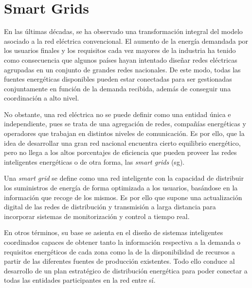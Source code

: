\section{Smart Grids}
\label{sec:smartgrids}


En las últimas décadas, se ha observado una transformación integral del modelo asociado a la red eléctrica convencional. El aumento de la energía demandada por los usuarios finales y los requisitos cada vez mayores de la industria ha tenido como consecuencia que algunos países hayan intentado diseñar redes eléctricas agrupadas en un conjunto de grandes redes nacionales. De este modo, todas las fuentes energéticas disponibles pueden estar conectadas para ser gestionadas conjuntamente en función de la demanda recibida, además de conseguir una coordinación a alto nivel. \cite{smartgrid_overview}

\vspace{3mm}

No obstante, una red eléctrica no se puede definir como una entidad única e independiente, pues se trata de una agregación de redes, compañías energéticas y operadores que trabajan en distintos niveles de comunicación. Es por ello, que la idea de desarrollar una gran red nacional encuentra cierto equilibrio energético, pero no llega a los altos porcentajes de eficiencia que pueden proveer las redes inteligentes energéticas o de otra forma, las \textit{smart grids} (\gls{sg}). 

\vspace{3mm}

Una \textit{smart grid} \cite{iotfutura} \cite{repsol} se define como una red inteligente con la capacidad de distribuir los suministros de energía de forma optimizada a los usuarios, basándose en la información que recoge de los mismos. Es por ello que supone una actualización digital de las redes de distribución y transmisión a larga distancia para incorporar sistemas de monitorización y control a tiempo real.

\vspace{3mm}

En otros términos, su base se asienta en el diseño de sistemas inteligentes coordinados capaces de obtener tanto la información respectiva a la demanda o requisitos energéticos de cada zona como la de la disponibilidad de recursos a partir de las diferentes fuentes de producción existentes. Todo ello conduce al desarrollo de un plan estratégico de distribución energética para poder conectar a todas las entidades participantes en la red entre sí.

